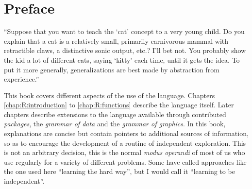 \chapter*{Preface}

\begin{VF}
``Suppose that you want to teach the `cat' concept to a very young child. Do you explain that a cat is a relatively small, primarily carnivorous mammal with retractible claws, a distinctive sonic output, etc.? I'll bet not. You probably show the kid a lot of different cats, saying `kitty' each time, until it gets the idea. To put it more generally, generalizations are best made by abstraction from experience.''

\end{VF}



\noindent
This book covers different aspects of the use of the \Rlang language. Chapters \ref{chap:R:introduction} to \ref{chap:R:functions} describe the \Rlang language itself. Later chapters describe extensions to the \Rlang language available through contributed \emph{packages}, the \emph{grammar of data} and the \emph{grammar of graphics}. In this book, explanations are concise but contain pointers to additional sources of information, so as to encourage the development of a routine of independent exploration. This is not an arbitrary decision, this is the normal \emph{modus operandi} of most of us who use \Rlang regularly for a variety of different problems. Some have called approaches like the one used here ``learning the hard way'', but I would call it ``learning to be independent''.

